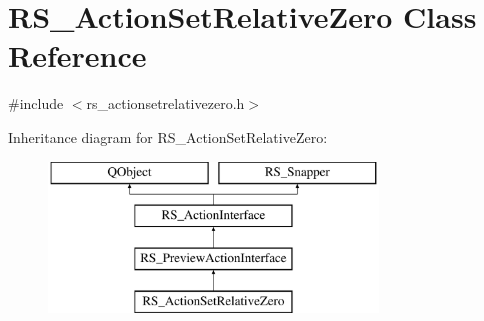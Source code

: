 \hypertarget{classRS__ActionSetRelativeZero}{\section{R\-S\-\_\-\-Action\-Set\-Relative\-Zero Class Reference}
\label{classRS__ActionSetRelativeZero}
}


{\ttfamily \#include $<$rs\-\_\-actionsetrelativezero.\-h$>$}

Inheritance diagram for R\-S\-\_\-\-Action\-Set\-Relative\-Zero\-:\begin{figure}[H]
\begin{center}
\leavevmode
\includegraphics[height=4.000000cm]{classRS__ActionSetRelativeZero}
\end{center}
\end{figure}
